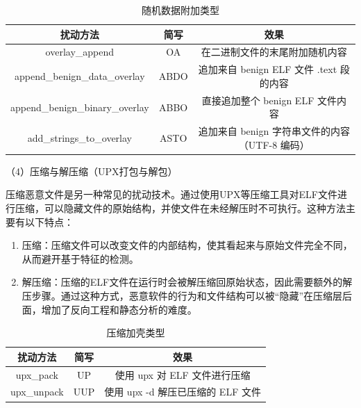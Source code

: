 \begin{table}[htbp]
	\centering
	\caption{随机数据附加类型}\label{tab:4.3}
	\begin{tabular*}{\textwidth}{@{\extracolsep{\fill}}ccc}
		\toprule
		扰动方法 & 简写 & 效果 \\
		\midrule
		overlay\_append & OA & 在二进制文件的末尾附加随机内容 \\
		append\_benign\_data\_overlay & ABDO & 追加来自 benign ELF 文件 .text 段的内容 \\
		append\_benign\_binary\_overlay & ABBO & 直接追加整个 benign ELF 文件内容 \\
		add\_strings\_to\_overlay & ASTO & 追加来自 benign 字符串文件的内容（UTF-8 编码） \\
		\bottomrule
	\end{tabular*}
\end{table}

（4）压缩与解压缩（UPX打包与解包）


压缩恶意文件是另一种常见的扰动技术。通过使用UPX等压缩工具对ELF文件进行压缩，可以隐藏文件的原始结构，并使文件在未经解压时不可执行。这种方法主要有以下特点：

\begin{enumerate}

\item 压缩：压缩文件可以改变文件的内部结构，使其看起来与原始文件完全不同，从而避开基于特征的检测。


\item 解压缩：压缩的ELF文件在运行时会被解压缩回原始状态，因此需要额外的解压步骤。通过这种方式，恶意软件的行为和文件结构可以被“隐藏”在压缩层后面，增加了反向工程和静态分析的难度。
\end{enumerate}
\begin{table}[htbp]
	\centering
	\caption{压缩加壳类型}\label{tab:4.4}
	\begin{tabular*}{0.9\textwidth}{@{\extracolsep{\fill}}ccc}
		\toprule
		扰动方法 & 简写 & 效果 \\
		\midrule
		upx\_pack & UP & 使用 upx 对 ELF 文件进行压缩 \\
		upx\_unpack & UUP & 使用 upx -d 解压已压缩的 ELF 文件 \\
		\bottomrule
	\end{tabular*}
\end{table}

